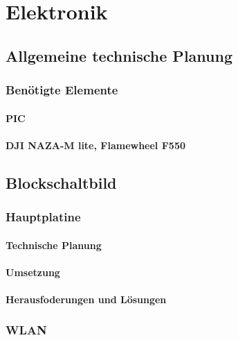 \chapter{Elektronik}
\renewcommand{\kapitelautor}{Autor: Lucas Ullrich}

\section{Allgemeine technische Planung}

  \subsection{Benötigte Elemente}

    \subsubsection{PIC}

    \subsubsection{DJI NAZA-M lite, Flamewheel F550}

\section{Blockschaltbild}

  \subsection{Hauptplatine}

    \subsubsection{Technische Planung}

    \subsubsection{Umsetzung}

    \subsubsection{Herausfoderungen und Lösungen}

  \subsection{WLAN}

